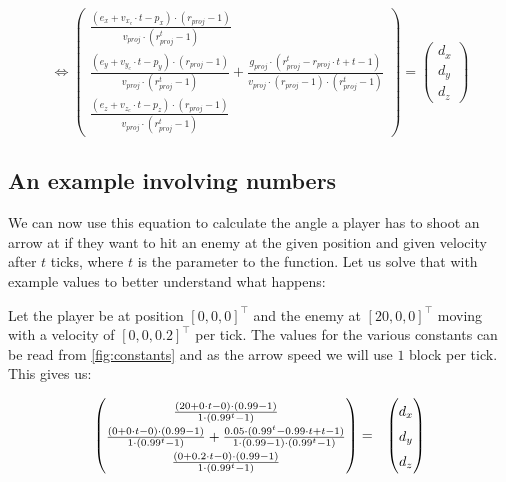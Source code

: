 \begin{equation*}
     \renewcommand*{\arraystretch}{1.5}
    \Leftrightarrow 
    \begin{pmatrix}
        \frac{(e_x +  v_{x_e} \cdot t - p_x) \cdot (r_{proj} - 1)}{v_{proj} \cdot (r_{proj}^t - 1)} \\
        \frac{(e_y +  v_{y_e} \cdot t - p_y) \cdot (r_{proj} - 1)}{v_{proj} \cdot (r_{proj}^t - 1)} + 
            \frac{g_{proj} \cdot (r_{proj}^t - r_{proj} \cdot t + t - 1)}{v_{proj} \cdot (r_{proj} - 1) \cdot (r_{proj}^t - 1)} \\
        \frac{(e_z +  v_{z_e} \cdot t - p_z) \cdot (r_{proj} - 1)}{v_{proj} \cdot (r_{proj}^t - 1)}
    \end{pmatrix}
    =
    {\begin{pmatrix} d_x \\ d_y \\ d_z \end{pmatrix}}
\end{equation*}


\subsection{An example involving numbers}

We can now use this equation to calculate the angle a player has to shoot an arrow at if they want to hit an enemy at the given position and given velocity after $t$ ticks, where $t$ is the parameter to the function. Let us solve that with example values to better understand what happens:

Let the player be at position $[0, 0, 0]^\top$ and the enemy at $[20, 0, 0]^\top$ moving with a velocity of $[0, 0, 0.2]^\top$ per tick. The values for the various constants can be read from \figurename{} \ref{fig:constants} and as the arrow speed we will use $1$ block per tick. This gives us:

\begin{eqnarray*}
    \renewcommand*{\arraystretch}{1.5}
    \begin{pmatrix}
        \frac{(20 + 0 \cdot t - 0) \cdot (0.99 - 1)}{1 \cdot (0.99^t - 1)} \\
        \frac{(0 + 0 \cdot t - 0) \cdot (0.99 - 1)}{1 \cdot (0.99^t - 1)}
            + \frac{0.05 \cdot (0.99^t-0.99 \cdot t+t-1)}{1 \cdot (0.99-1) \cdot (0.99^t-1)} \\
        \frac{(0 + 0.2 \cdot t - 0) \cdot (0.99 - 1)}{1 \cdot (0.99^t - 1)}
    \end{pmatrix}
    & = & 
    \begin{pmatrix} d_x \\ d_y \\ d_z \end{pmatrix}
\end{eqnarray*}

